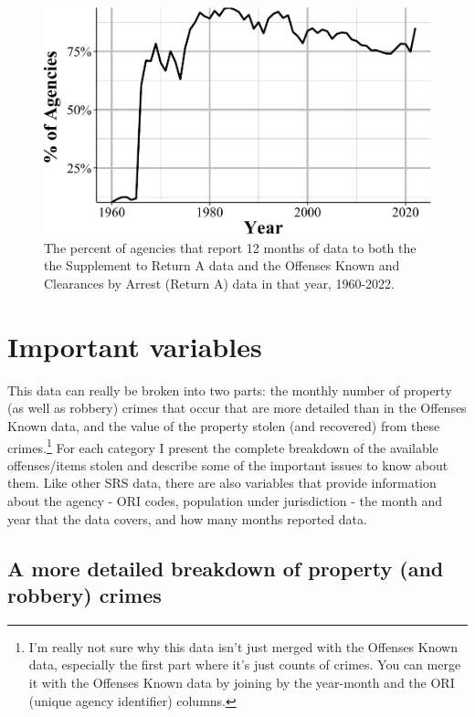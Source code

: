 \documentclass[
  12pt,
  openany]{book}
\begin{document}
\begin{figure}

{\centering \includegraphics[width=0.9\linewidth]{04_stolen_property_files/figure-latex/agenciesInBoth12Month-1} 

}

\caption{The percent of agencies that report 12 months of data to both the the Supplement to Return A data and the Offenses Known and Clearances by Arrest (Return A) data in that year, 1960-2022.}\label{fig:agenciesInBoth12Month}
\end{figure}

\section{Important variables}\label{important-variables-1}

This data can really be broken into two parts: the monthly number of property (as well as robbery) crimes that occur that are more detailed than in the Offenses Known data, and the value of the property stolen (and recovered) from these crimes.\footnote{I'm really not sure why this data isn't just merged with the Offenses Known data, especially the first part where it's just counts of crimes. You can merge it with the Offenses Known data by joining by the year-month and the ORI (unique agency identifier) columns.} For each category I present the complete breakdown of the available offenses/items stolen and describe some of the important issues to know about them. Like other SRS data, there are also variables that provide information about the agency - ORI codes, population under jurisdiction - the month and year that the data covers, and how many months reported data.

\subsection{A more detailed breakdown of property (and robbery) crimes}\label{propertycount}
\end{document}
